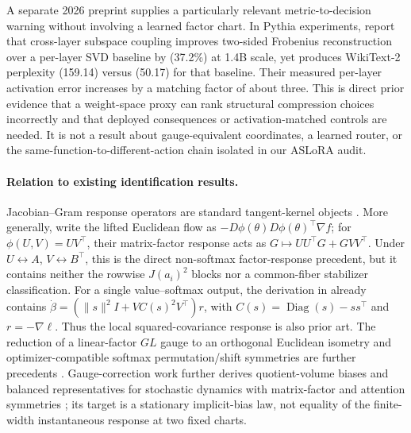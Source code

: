 A separate 2026 preprint supplies a particularly relevant metric-to-decision
warning without involving a learned factor chart.  In Pythia experiments,
\citet{khilar2026crosslayer} report that cross-layer subspace coupling improves
two-sided Frobenius reconstruction over a per-layer SVD baseline by (37.2\%)
at 1.4B scale, yet produces WikiText-2 perplexity (159.14) versus (50.17)
for that baseline.  Their measured per-layer activation error increases by a
matching factor of about three.  This is direct prior evidence that a
weight-space proxy can rank structural compression choices incorrectly and
that deployed consequences or activation-matched controls are needed.  It is
not a result about gauge-equivalent coordinates, a learned router, or the
same-function-to-different-action chain isolated in our ASLoRA audit.

\paragraph{Relation to existing identification results.}
Jacobian--Gram response operators are standard tangent-kernel objects
\citep{jacot2018neural}.  More generally, \citet{marcotte2026intrinsic} write
the lifted Euclidean flow as
$-D\phi(\theta)D\phi(\theta)^\top\nabla f$; for
$\phi(U,V)=UV^\top$, their matrix-factor response acts as
$G\mapsto UU^\top G+GVV^\top$.  Under
$U\leftrightarrow A$, $V\leftrightarrow B^\top$, this is the direct
non-softmax factor-response precedent, but it contains neither the rowwise
$J(a_i)^2$ blocks nor a common-fiber stabilizer classification.
For a single value--softmax output, the derivation in
\citet[Lemma~D.2]{varre2026gradient} already contains
$\dot\beta=(\|s\|^2I+VC(s)^2V^\top)r$, with
$C(s)=\operatorname{Diag}(s)-ss^\top$ and $r=-\nabla\ell$.
Thus the local squared-covariance response is also prior art.
The reduction of a linear-factor $GL$ gauge to an orthogonal Euclidean
isometry and optimizer-compatible softmax permutation/shift symmetries
are further precedents \citep{singh2026loss,lau2026symmetry}.
Gauge-correction work further derives quotient-volume biases and balanced
representatives for stochastic dynamics with matrix-factor and attention
symmetries \citep{aladrah2026implicit}; its target is a stationary
implicit-bias law, not equality of the finite-width instantaneous response at
two fixed charts.

